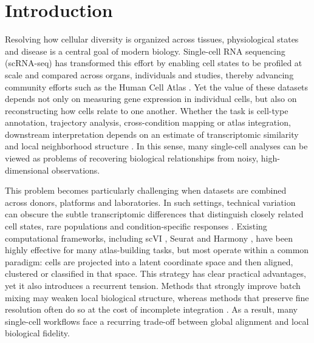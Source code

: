\documentclass[11pt]{article}
\begin{document}
\section{Introduction}

Resolving how cellular diversity is organized across tissues, physiological states and disease is a central goal of modern biology. Single-cell RNA sequencing (scRNA-seq) has transformed this effort by enabling cell states to be profiled at scale and compared across organs, individuals and studies, thereby advancing community efforts such as the Human Cell Atlas \cite{Regev2017HCA}. Yet the value of these datasets depends not only on measuring gene expression in individual cells, but also on reconstructing how cells relate to one another. Whether the task is cell-type annotation, trajectory analysis, cross-condition mapping or atlas integration, downstream interpretation depends on an estimate of transcriptomic similarity and local neighborhood structure \cite{Luecken2019BestPractices}. In this sense, many single-cell analyses can be viewed as problems of recovering biological relationships from noisy, high-dimensional observations.

This problem becomes particularly challenging when datasets are combined across donors, platforms and laboratories. In such settings, technical variation can obscure the subtle transcriptomic differences that distinguish closely related cell states, rare populations and condition-specific responses \cite{Korsunsky2019Harmony,Luecken2022BenchmarkingIntegration}. Existing computational frameworks, including scVI \cite{Lopez2018scVI}, Seurat \cite{Stuart2019Seurat,Hao2021Multimodal} and Harmony \cite{Korsunsky2019Harmony}, have been highly effective for many atlas-building tasks, but most operate within a common paradigm: cells are projected into a latent coordinate space and then aligned, clustered or classified in that space. This strategy has clear practical advantages, yet it also introduces a recurrent tension. Methods that strongly improve batch mixing may weaken local biological structure, whereas methods that preserve fine resolution often do so at the cost of incomplete integration \cite{Korsunsky2019Harmony,Luecken2022BenchmarkingIntegration}. As a result, many single-cell workflows face a recurring trade-off between global alignment and local biological fidelity.
\end{document}

